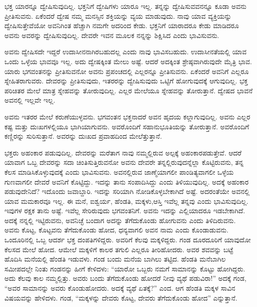 ಭಕ್ತ ಯಾರನ್ನೂ ದ್ವೇಷಿಸುವುದಿಲ್ಲ. ಭಕ್ತನಿಗೆ ದ್ವೇಷಿಗಳು ಯಾರೂ ಇಲ್ಲ. ತನ್ನನ್ನು ದ್ವೇಷಿಸುವವನನ್ನೂ ಕೂಡಾ ಅವನು ಪ್ರೀತಿಸುವನು. ಏಕೆಂದರೆ ದ್ವೇಷ ನಮ್ಮ ಮನಸ್ಸಿನ ಶಕ್ತಿಯನ್ನು ವ್ಯಯ ಮಾಡುವುದು. ನಾವು ಯಾವ ವ್ಯಕ್ತಿಯನ್ನು ದ್ವೇಷಿಸುತ್ತೇವೆಯೋ ಅವನಿಗಿಂತ ಹೆಚ್ಚಾಗಿ ನಮಗೇ ಅದರಿಂದ ಕೇಡು. ಭಕ್ತನಿಗೆ ಯಾರಾದರೂ ಕೇಡು ಮಾಡಿದರೂ ಅವನು ಅವರನ್ನು ದ್ವೇಷಿಸುವುದಿಲ್ಲ. ದೇವರೇ ಇವನ ಮೂಲಕ ನನ್ನನ್ನು ಶಿಕ್ಷಿಸಿದ ಎಂದು ಭಾವಿಸುವನು.

ಅವನು ದ್ವೇಷಿಸದೇ ಇದ್ದರೆ ಉದಾಸೀನನಾಗಿರಬಹುದಲ್ಲ ಎಂದು ನಾವು ಭಾವಿಸಬಹುದು. ಉದಾಸೀನತೆಯಲ್ಲಿ ಯಾವ ಒಂದು ಒಳ್ಳೆಯ ಭಾವವೂ ಇಲ್ಲ. ಅದು ದ್ವೇಷಕ್ಕಿಂತ ಮೇಲು ಅಷ್ಟೆ. ಆದರೆ ಅದಕ್ಕಿಂತ ಶ್ರೇಷ್ಠವಾಗಿರುವುದೇ ಮೈತ್ರಿ ಭಾವ. ಯಾರು ಭಗವಂತನನ್ನು ಪ್ರೀತಿಸುವನೋ ಅವನು ಪ್ರಪಂಚದಲ್ಲಿ ಎಲ್ಲರನ್ನೂ ಪ್ರೀತಿಸುವನು. ಏಕೆಂದರೆ ಅವನಿಗೆ ಎಲ್ಲರೂ ಸ್ನೇಹಿತರಾಗುವರು. ದೇವರನ್ನು ಪ್ರೀತಿಸುವುದು, ಇತರರನ್ನು ದ್ವೇಷಿಸುವುದು ಒಟ್ಟಿಗೆ ಹೋಗುವುದಕ್ಕೆ ಆಗುವುದಿಲ್ಲ. ಭಕ್ತ ಪರಿಚಿತರ ಮೇಲೆ ಮಾತ್ರ ಸ್ನೇಹವನ್ನು ತೋರುವುದಿಲ್ಲ. ಎಲ್ಲರ ಮೇಲೆಯೂ ಸ್ನೇಹವನ್ನು ತೋರುತ್ತಾನೆ. ದ್ವೇಷದ ಭಾವನೆ ಅವನಲ್ಲಿ ಇಲ್ಲವೇ ಇಲ್ಲ.

\newpage

ಅವನು ಇತರರ ಮೇಲೆ ಕರುಣೆಯುಳ್ಳವನು. ಭಗವಂತನ ಭಕ್ತನಾದರೆ ಅವನ ಹೃದಯ ಕಲ್ಲಾಗುವುದಿಲ್ಲ. ಅವನು ಎಲ್ಲರ ಕಷ್ಟ ಮತ್ತು ದುಃಖಗಳಲ್ಲಿಯೂ ಭಾಗಿಯಾಗುವನು. ಅವರೊಂದಿಗೆ ಸಹಾನುಭೂತಿಯನ್ನು ತೋರುತ್ತಾನೆ. ಅವರೊಂದಿಗೆ ಕಣ್ಣಿರನ್ನು ಸುರಿಸುತ್ತಾನೆ. ಅವರನ್ನು ದುಃಖದ ಪ್ರವಾಹದಿಂದ ಮೇಲೆತ್ತುತ್ತಾನೆ.

ಭಕ್ತರು ಅಹಂಕಾರ ಪಡುವುದಿಲ್ಲ. ದೇವರನ್ನು ಮರೆತಾಗ ನಾವು ನಮ್ಮಲ್ಲಿರುವ ಅಲ್ಪಕ್ಕೆ ಅಹಂಕಾರಪಡುತ್ತೇವೆ. ಆದರೆ ಯಾವಾಗ ಒಬ್ಬ ದೇವರನ್ನು ಸದಾ ಚಿಂತಿಸುತ್ತಿರುವನೋ ಅವನು ದೇವರೇ ತನ್ನಲ್ಲಿರುವುದನ್ನೆಲ್ಲಾ ಕೊಟ್ಟಿರುವನು, ತನ್ನ ಕೆಲಸ ಮಾಡಿಸಿಕೊಳ್ಳುವುದಕ್ಕೆ ಎಂದು ಭಾವಿಸು\-ವನು. ಅವನಲ್ಲಿರುವ ಜಾಣ್ಮೆಯಾಗಲೀ ಪಾಂಡಿತ್ಯವಾಗಲೀ ಒಳ್ಳೆಯ ಗುಣವಾಗಲೀ ದೇವರೆ ಅವನಿಗೆ ಕೊಟ್ಟಿದ್ದು. ಇದನ್ನು ತಾನು ಸಂಪಾದಿಸಿದ್ದು ಎಂದು ತಿಳಿಯುವುದಿಲ್ಲ. ಅದಕ್ಕೆ ಅಹಂಕಾರ ಪಡುವುದೇನಿದೆ? ಇದೊಂದು ಜವಾಬ್ದಾರಿ. ಇದನ್ನು ಸರಿಯಾಗಿ ನೋಡಿಕೊಳ್ಳಬೇಕಾಗಿದೆ ಅಷ್ಟೆ. ಅದರಂತೆಯೇ ಅವನಲ್ಲಿ ಯಾವ ಮಮಕಾರವೂ ಇಲ್ಲ. ಈ ಮನೆ, ಐಶ್ವರ್ಯ, ಹೆಂಡತಿ, ಮಕ್ಕಳು,ಆಸ್ತಿ ಇವೆಲ್ಲ ತನ್ನವು ಎಂದು ಭಾವಿಸುವುದಿಲ್ಲ. ಇವುಗಳ ರಕ್ಷಕ ತಾನು ಅಷ್ಟೆ. ಇವೆಲ್ಲ ಸೇರಿರುವುದು ಭಗವಂತನಿಗೆ. ಅವನು ಇದನ್ನು ಎಲ್ಲಿಯಾದರೂ ಇಡಬೇಕಾಗಿದೆ. ಅದಕ್ಕೆ ನನ್ನಲ್ಲಿ ಇಟ್ಟಿರುವನು, ಅವನಿಚ್ಛೆ ಬಂದಾಗ ಅದನ್ನು ತೆಗೆದುಕೊಂಡು ಹೋಗುವನು ಎಂದು ತಿಳಿದಿರುವನು. ಅವನು ಕೊಟ್ಟ, ಕೊಟ್ಟವನು ತೆಗೆದುಕೊಂಡು ಹೋದ, ಧನ್ಯವಾಗಲಿ ಅವನ ನಾಮ ಎಂದು ಕೊಂಡಾಡುವನು. ಒಂದೂರಿನಲ್ಲಿ ಒಬ್ಬ ಆದರ್ಶ ಭಕ್ತ ದಂಪತಿಗಳಿದ್ದರು. ಅವರಿಗೆ ಕೆಲವು ಮಕ್ಕಳಿದ್ದರು. ಗಂಡ ದೂರದೂರಿಗೆ ಯಾವುದೋ ಕೆಲಸದ ಮೇಲೆ ಹೋದ. ಆಮೇಲೆ ಮಕ್ಕಳಿಗೆ ಕಾಲರ ತಗುಲಿ ಎಲ್ಲರೂ ತೀರಿಹೋದರು. ಅವರ ಶವವನ್ನು ಬಟ್ಟೆ ಹೊದಿಸಿ ಮನೆಯಲ್ಲಿ ಹೆಂಡತಿ ಇಡುವಳು. ಗಂಡ ಬಂದು ಮನೆಯ ಬಾಗಿಲು ತಟ್ಟಿದ. ಹೆಂಡತಿ ಮನೆಬಾಗಿಲ ಸಮೀಪದಲ್ಲೇ ನಿಂತು ಗಂಡನನ್ನು ಹೀಗೆ ಕೇಳಿದಳು: “ಯಾರೋ ಒಬ್ಬರು ನಮಗೆ ಸಾಮಾನನ್ನು ಕೊಟ್ಟು ಹೋಗಿದ್ದರು. ಅದು ಕೆಲವು ಕಾಲ ನಮ್ಮಲ್ಲಿತ್ತು. ಅವರು ಬಂದು ತೆಗೆದುಕೊಂಡು ಹೋದರೆ ನೀವು ವ್ಯಥೆ ಪಡುವಿರಾ!” ಅದಕ್ಕೆ ಗಂಡ, “ಅವರ ಸಾಮಾನನ್ನು ಅವರು ಕೊಂಡುಹೋದರು. ಅದಕ್ಕೆ ವ್ಯಥೆ ಏತಕ್ಕೆ?” ಎಂದ. ಆಗ ಹೆಂಡತಿ ಮಕ್ಕಳ ಸಾವಿನ ವಿಷಯವನ್ನು ಹೇಳಿದಳು. ಗಂಡ, “ಮಕ್ಕಳನ್ನು ದೇವರು ಕೊಟ್ಟ, ದೇವರು ತೆಗೆದುಕೊಂಡು ಹೋದ” ಎನ್ನುತ್ತಾನೆ.

